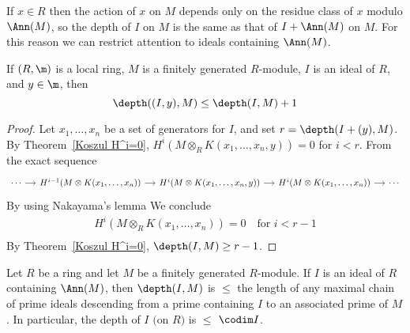 If $x\in R$ then the action of $x$ on $M$ depends only on the residue class of $x$ modulo $\Ann(M)$, so the depth of $I$ on $M$ is the same as that of $I+\Ann(M)$ on $M$. For this reason we can restrict attention to ideals containing $\Ann(M)$.
\begin{lemma}\label{depth lem +1}
If $(R,\m)$ is a local ring, $M$ is a finitely generated $R$-module, $I$ is an ideal of $R$, and $y\in\m$, then
\[\depth((I,y),M)\leq\depth(I,M)+1\]
\end{lemma}
\begin{proof}
Let $x_1,\dots,x_n$ be a set of generators for $I$, and set $r=\depth(I+(y),M)$. By Theorem~\ref{Koszul H^i=0}, $H^i(M\otimes_RK(x_1,\dots,x_n,y))=0$ for $i<r$. From the exact sequence
\[\begin{tikzcd}[column sep=small]
\cdots\ar[r]&H^{i-1}(M\otimes K(x_1,\dots,x_n))\ar[r]&H^{i}(M\otimes K(x_1,\dots,x_n,y))\ar[r]&H^{i}(M\otimes K(x_1,\dots,x_n))\ar[r]&\cdots
\end{tikzcd}\]
By using Nakayama's lemma We conclude 
\[\begin{array}{c}
H^i(M\otimes_RK(x_1,\dots,x_n))=0\quad\text{for }i<r-1\\
\end{array}\] 
By Theorem~\ref{Koszul H^i=0}, $\depth(I,M)\geq r-1$.
\end{proof}
\begin{proposition}\label{depth leq codim}
Let $R$ be a ring and let $M$ be a finitely generated $R$-module. If $I$ is an ideal of $R$ containing $\Ann(M)$, then $\depth(I,M)$ is $\leq$ the length of any maximal chain of prime ideals descending from a prime containing $I$ to an associated prime of $M$. In particular, the depth of $I$ $($on $R)$ is $\leq$ $\codim I$.
\end{proposition}
